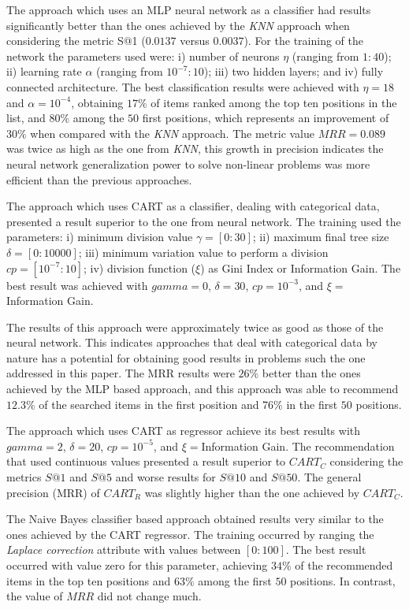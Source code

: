\documentclass{RITA}
\begin{document}
The approach which uses an MLP neural network as a classifier had results significantly better than the ones achieved by the \emph{KNN} approach when considering the metric S@1 (\(0.0137\) versus \(0.0037\)). For the training of the network the parameters used were: i) number of neurons \(\eta\) (ranging from \(1:40\)); ii) learning rate \(\alpha\) (ranging from \(10^{-7}: 10\)); iii) two hidden layers; and iv) fully connected architecture. The best classification results were achieved with \(\eta = 18\) and \(\alpha = 10^{-4}\), obtaining \(17\%\) of items ranked among the top ten positions in the list, and \(80\%\) among the \(50\) first positions, which represents an improvement of \(30\%\) when compared with the \emph{KNN} approach. The metric value \(MRR = 0.089\) was twice as high as the one from \emph{KNN}, this growth in precision indicates the neural network generalization power to solve non-linear problems was more efficient than the previous approaches.

The approach which uses CART as a classifier, dealing with categorical data, presented a result superior to the one from neural network. The training used the parameters: i) minimum division value \(\gamma = [0:30]\); ii) maximum final tree size \(\delta = [0:10000]\); iii) minimum variation value to perform a division \(cp = [10^{-7}:10]\); iv) division function (\(\xi\)) as Gini Index or Information Gain. The best result was achieved with \(gamma = 0\), \(\delta = 30\), \(cp = 10^{-3} \), and \(\xi = \) Information Gain.

The results of this approach were approximately twice as good as those of the neural network. This indicates approaches that deal with categorical data by nature has a potential for obtaining good results in problems such the one addressed in this paper. The MRR results were \(26\%\) better than the ones achieved by the MLP based approach, and this approach was able to recommend \(12.3\%\) of the searched items in the first position and 76\% in the first \(50\) positions.

The approach which uses CART as regressor achieve its best results with \(gamma = 2\), \(\delta = 20\), \(cp = 10^{-5}\), and \(\xi = \)Information Gain. The recommendation that used continuous values presented a result superior to \(CART_C\) considering the metrics \(S@1\) and \(S@5\) and worse results for \(S@10\) and \(S@50\). The general precision (MRR) of \(CART_R\) was slightly higher than the one achieved by \(CART_C\).

The Naive Bayes classifier based approach obtained results very similar to the ones achieved by the CART regressor. The training occurred by ranging the \emph{Laplace correction} attribute with values between \([0:100]\). The best result occurred with value zero for this parameter, achieving \(34\%\) of the recommended items in the top ten positions and \(63\%\) among the first \(50\) positions. In contrast, the value of \(MRR\) did not change much.
\end{document}
